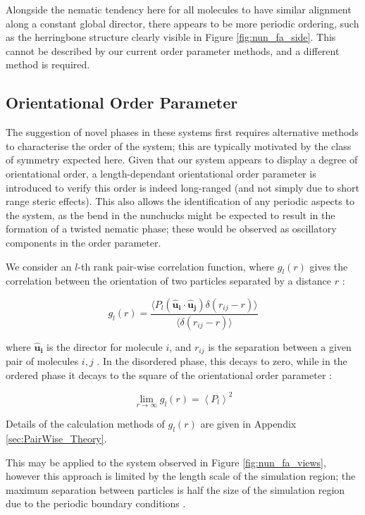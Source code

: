 \documentclass[11pt, a4paper]{article} %
\begin{document}
Alongside the nematic tendency here for all molecules to have similar alignment along a constant global director, there appears to be more periodic ordering, such as the herringbone structure clearly visible in Figure \ref{fig:nun_fa_side}. This cannot be described by our current order parameter methods, and a different method is required.


\subsection{Orientational Order Parameter} \label{sec:PairWise_Application}
The suggestion of novel phases in these systems first requires alternative methods to characterise the order of the system; this are typically motivated by the class of symmetry expected here. Given that our system appears to display a degree of orientational order, a length-dependant orientational order parameter is introduced to verify this order is indeed long-ranged (and not simply due to short range steric effects). This also allows the identification of any periodic aspects to the system, as the bend in the nunchucks might be expected to result in the formation of a twisted nematic phase; these would be observed as oscillatory components in the order parameter.

We consider an $l$-th rank pair-wise correlation function, where $g_{l}(r)$ gives the correlation between the orientation of two particles separated by a distance $r$ :

\begin{equation} \label{eq:PairWise_eq}
g_{l}(r) = \frac{\langle P_{l}(\boldsymbol{\hat{u}_{i}}\cdot \boldsymbol{\hat{u}_{j}}) \delta(r_{ij}-r)\rangle}{\langle  \delta(r_{ij}-r) \rangle}
\end{equation}

where $\boldsymbol{\hat{u}_{i}}$ is the director for molecule $i$, and $r_{ij}$ is the separation between a given pair of molecules $i,j$ \cite{Zannoni1979}. In the disordered phase, this decays to zero, while in the ordered phase it decays to the square of the orientational order parameter \cite{Frenkel1985b}:

\begin{equation}
\lim_{r \to \infty}g_{l}(r) = \left\langle P_{l} \right\rangle ^{2}
\end{equation}

Details of the calculation methods of $g_{l}(r)$ are given in Appendix \ref{sec:PairWise_Theory}. 

This may be applied to the system observed in Figure \ref{fig:nun_fa_views}, however this approach is limited by the length scale of the simulation region; the maximum separation between particles is half the size of the simulation region due to the periodic boundary conditions \cite{Frenkel1985c}.
\end{document}
